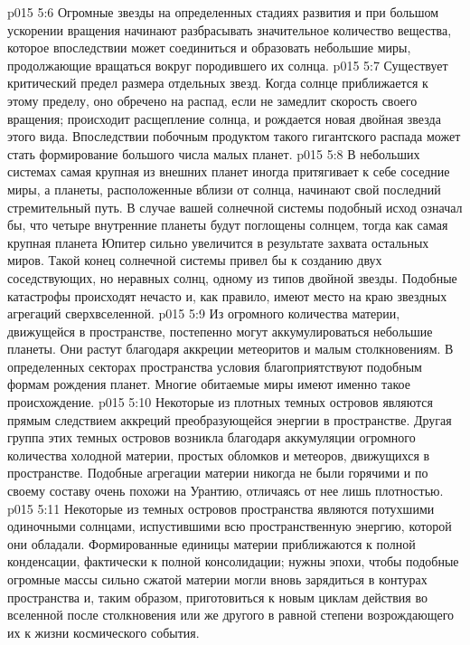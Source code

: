 \vs p015 5:6 \bibnobreakspace {} Огромные звезды на определенных стадиях развития и при большом ускорении вращения начинают разбрасывать значительное количество вещества, которое впоследствии может соединиться и образовать небольшие миры, продолжающие вращаться вокруг породившего их солнца.
\vs p015 5:7 \bibnobreakspace {} Существует критический предел размера отдельных звезд. Когда солнце приближается к этому пределу, оно обречено на распад, если не замедлит скорость своего вращения; происходит расщепление солнца, и рождается новая двойная звезда этого вида. Впоследствии побочным продуктом такого гигантского распада может стать формирование большого числа малых планет.
\vs p015 5:8 \bibnobreakspace {} В небольших системах самая крупная из внешних планет иногда притягивает к себе соседние миры, а планеты, расположенные вблизи от солнца, начинают свой последний стремительный путь. В случае вашей солнечной системы подобный исход означал бы, что четыре внутренние планеты будут поглощены солнцем, тогда как самая крупная планета Юпитер сильно увеличится в результате захвата остальных миров. Такой конец солнечной системы привел бы к созданию двух соседствующих, но неравных солнц, одному из типов двойной звезды. Подобные катастрофы происходят нечасто и, как правило, имеют место на краю звездных агрегаций сверхвселенной.
\vs p015 5:9 \bibnobreakspace {} Из огромного количества материи, движущейся в пространстве, постепенно могут аккумулироваться небольшие планеты. Они растут благодаря аккреции метеоритов и малым столкновениям. В определенных секторах пространства условия благоприятствуют подобным формам рождения планет. Многие обитаемые миры имеют именно такое происхождение.
\vs p015 5:10 Некоторые из плотных темных островов являются прямым следствием аккреций преобразующейся энергии в пространстве. Другая группа этих темных островов возникла благодаря аккумуляции огромного количества холодной материи, простых обломков и метеоров, движущихся в пространстве. Подобные агрегации материи никогда не были горячими и по своему составу очень похожи на Урантию, отличаясь от нее лишь плотностью.
\vs p015 5:11 \bibnobreakspace {} Некоторые из темных островов пространства являются потухшими одиночными солнцами, испустившими всю пространственную энергию, которой они обладали. Формированные единицы материи приближаются к полной конденсации, фактически к полной консолидации; нужны эпохи, чтобы подобные огромные массы сильно сжатой материи могли вновь зарядиться в контурах пространства и, таким образом, приготовиться к новым циклам действия во вселенной после столкновения или же другого в равной степени возрождающего их к жизни космического события.
